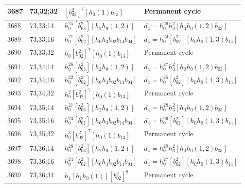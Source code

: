 \documentclass{article}
\begin{document}
\begin{longtable}{|l|l|>{\raggedright\arraybackslash}p{6cm}|>{\raggedright\arraybackslash}p{6cm}|}
\hline
3687 & 73,32;32 & $[b_{02}^2]^7[h_0(1)b_{13}]$ & Permanent cycle\\
\hline
3688 & 73,33;14 & $h_0^{25}[b_{03}^2][h_2h_0(1, 2)]$ &$d_{4}=h_0^{26}h_3^2[h_0h_0(1, 2)b_{03}]$\\
\hline
3689 & 73,33;16 & $h_0^{21}[b_{02}^2][h_0h_3b_{02}b_{14}b_{04}]$ &$d_{4}=h_0^{24}[b_{02}^2][h_0h_0(1, 3)b_{14}]$\\
\hline
3690 & 73,33;32 & $h_0[b_{02}^2]^7[h_0(1)b_{13}]$ & Permanent cycle\\
\hline
3691 & 73,34;14 & $h_0^{26}[b_{03}^2][h_2h_0(1, 2)]$ &$d_{4}=h_0^{27}h_3^2[h_0h_0(1, 2)b_{03}]$\\
\hline
3692 & 73,34;16 & $h_0^{22}[b_{02}^2][h_0h_3b_{02}b_{14}b_{04}]$ &$d_{4}=h_0^{25}[b_{02}^2][h_0h_0(1, 3)b_{14}]$\\
\hline
3693 & 73,34;32 & $h_0^2[b_{02}^2]^7[h_0(1)b_{13}]$ & Permanent cycle\\
\hline
3694 & 73,35;14 & $h_0^{27}[b_{03}^2][h_2h_0(1, 2)]$ &$d_{4}=h_0^{28}h_3^2[h_0h_0(1, 2)b_{03}]$\\
\hline
3695 & 73,35;16 & $h_0^{23}[b_{02}^2][h_0h_3b_{02}b_{14}b_{04}]$ &$d_{4}=h_0^{26}[b_{02}^2][h_0h_0(1, 3)b_{14}]$\\
\hline
3696 & 73,35;32 & $h_0^3[b_{02}^2]^7[h_0(1)b_{13}]$ & Permanent cycle\\
\hline
3697 & 73,36;14 & $h_0^{28}[b_{03}^2][h_2h_0(1, 2)]$ &$d_{4}=h_0^{29}h_3^2[h_0h_0(1, 2)b_{03}]$\\
\hline
3698 & 73,36;16 & $h_0^{24}[b_{02}^2][h_0h_3b_{02}b_{14}b_{04}]$ &$d_{4}=h_0^{27}[b_{02}^2][h_0h_0(1, 3)b_{14}]$\\
\hline
3699 & 73,36;34 & $h_1[h_1h_0(1)][b_{02}^2]^8$ & Permanent cycle\\
\hline
\end{longtable}
\end{document}
